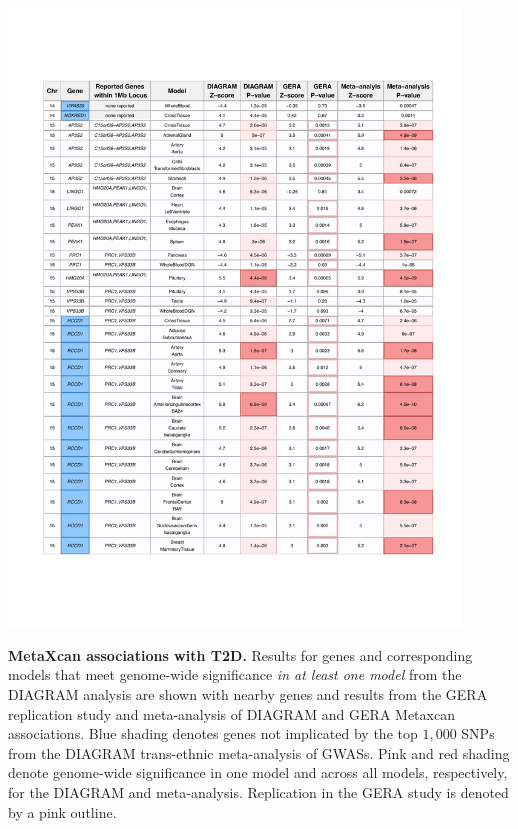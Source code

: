 \documentclass[10pt]{article}
\begin{document}
\begin{table}
\ContinuedFloat
	\includegraphics[width=0.90\textwidth]{supp_tab1_part5.pdf}
	\caption{\textbf{MetaXcan associations with T2D.} Results for genes and corresponding models that meet genome-wide significance \textit{in at least one model} from the DIAGRAM analysis are shown with nearby genes and results from the GERA replication study and meta-analysis of DIAGRAM and GERA Metaxcan associations. Blue shading denotes genes not implicated by the top $1,000$ SNPs from the DIAGRAM trans-ethnic meta-analysis of GWASs. Pink and red shading denote genome-wide significance in one model and across all models, respectively, for the DIAGRAM and meta-analysis. Replication in the GERA study is denoted by a pink outline.} 
	\label{tab:supp.table1.part5}
\end{table}
\end{document}
